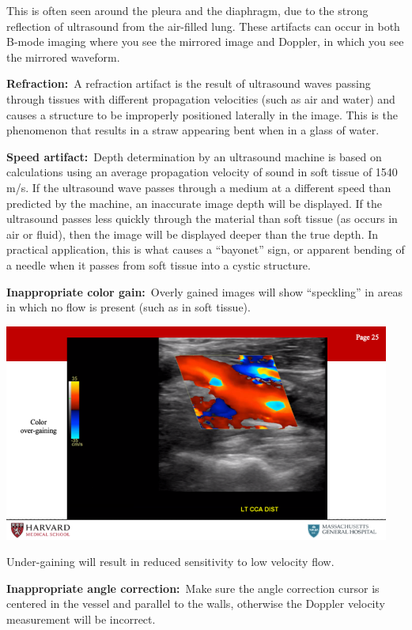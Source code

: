 \documentclass[
]{book}
\begin{document}
This is often seen around the pleura and the diaphragm, due to the
strong reflection of ultrasound from the air-filled lung. These
artifacts can occur in both B-mode imaging where you see the mirrored
image and Doppler, in which you see the mirrored waveform.

\textbf{Refraction:}~A refraction artifact is the result of ultrasound waves
passing through tissues with different propagation velocities (such as
air and water) and causes a structure to be improperly positioned
laterally in the image. This is the phenomenon that results in a straw
appearing bent when in a glass of water.

\textbf{Speed artifact:}~Depth determination by an ultrasound machine is
based on calculations using an average propagation velocity of sound in
soft tissue of 1540 m/s. If the ultrasound wave passes through a medium
at a different speed than predicted by the machine, an inaccurate image
depth will be displayed. If the ultrasound passes less quickly through
the material than soft tissue (as occurs in air or fluid), then the
image will be displayed deeper than the true depth. In practical
application, this is what causes a ``bayonet'' sign, or apparent bending
of a needle when it passes from soft tissue into a cystic structure.

\textbf{Inappropriate color gain:}~Overly gained images will show ``speckling''
in areas in which no flow is present (such as in soft tissue).

\includegraphics[width=5in]{images/vasc_lab/Slide26}

Under-gaining will result in reduced sensitivity to low velocity flow.

\textbf{Inappropriate angle correction:}~Make sure the angle correction
cursor is centered in the vessel and parallel to the walls, otherwise
the Doppler velocity measurement will be incorrect.
\end{document}

